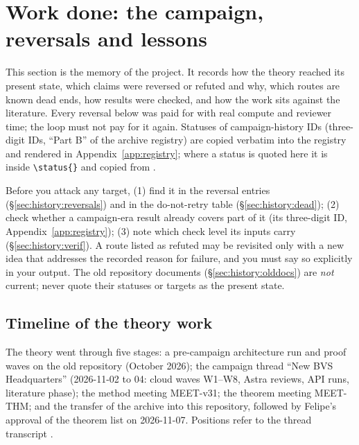 \section{Work done: the campaign, reversals and lessons}\label{sec:history}

This section is the memory of the project. It records how the theory reached its present state, which claims were reversed or refuted and why, which routes are known dead ends, how results were checked, and how the work sits against the literature. Every reversal below was paid for with real compute and reviewer time; the loop must not pay for it again. Statuses of campaign-history IDs (three-digit IDs, ``Part B'' of the archive registry) are copied verbatim into the registry and rendered in Appendix~\ref{app:registry}; where a status is quoted here it is inside \verb|\status{}| and copied from .

\begin{agentnote}
Before you attack any target, (1) find it in the reversal entries (\S\ref{sec:history:reversals}) and in the do-not-retry table (\S\ref{sec:history:dead}); (2) check whether a campaign-era result already covers part of it (its three-digit ID, Appendix~\ref{app:registry}); (3) note which check level its inputs carry (\S\ref{sec:history:verif}). A route listed as refuted may be revisited only with a new idea that addresses the recorded reason for failure, and you must say so explicitly in your output. The old repository documents (\S\ref{sec:history:olddocs}) are \emph{not} current; never quote their statuses or targets as the present state.
\end{agentnote}

\subsection{Timeline of the theory work}\label{sec:history:timeline}

The theory went through five stages: a pre-campaign architecture run and proof waves on the old repository (October 2026); the campaign thread ``New BVS Headquarters'' (2026-11-02 to 04: cloud waves W1--W8, Astra reviews, API runs, literature phase); the method meeting MEET-v31; the theorem meeting MEET-THM; and the transfer of the archive into this repository, followed by Felipe's approval of the theorem list on 2026-11-07. Positions  refer to the thread transcript .

